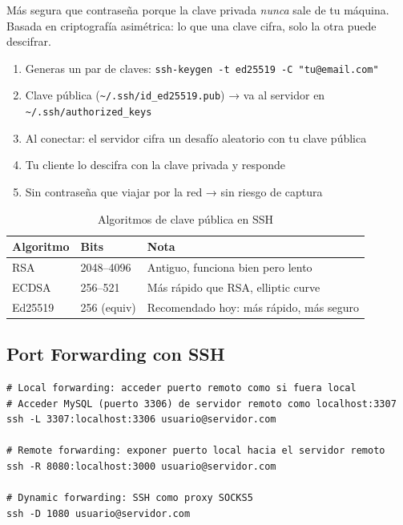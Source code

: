\begin{concepto}
Más segura que contraseña porque la clave privada \textit{nunca} sale de
tu máquina. Basada en criptografía asimétrica: lo que una clave cifra,
solo la otra puede descifrar.
\end{concepto}

\begin{enumerate}
    \item Generas un par de claves: \texttt{ssh-keygen -t ed25519 -C "tu@email.com"}
    \item Clave pública (\texttt{\textasciitilde/.ssh/id\_ed25519.pub}) → va al servidor
          en \texttt{\textasciitilde/.ssh/authorized\_keys}
    \item Al conectar: el servidor cifra un desafío aleatorio con tu clave pública
    \item Tu cliente lo descifra con la clave privada y responde
    \item Sin contraseña que viajar por la red → sin riesgo de captura
\end{enumerate}

\begin{table}[h!]
\centering
\renewcommand{\arraystretch}{1.3}
\begin{tabular}{lll}
\toprule
\textbf{Algoritmo} & \textbf{Bits} & \textbf{Nota} \\
\midrule
RSA       & 2048--4096  & Antiguo, funciona bien pero lento \\
ECDSA     & 256--521    & Más rápido que RSA, elliptic curve \\
Ed25519   & 256 (equiv) & Recomendado hoy: más rápido, más seguro \\
\bottomrule
\end{tabular}
\caption{Algoritmos de clave pública en SSH}
\end{table}

\subsection{Port Forwarding con SSH}

\begin{codigo}
\begin{lstlisting}
# Local forwarding: acceder puerto remoto como si fuera local
# Acceder MySQL (puerto 3306) de servidor remoto como localhost:3307
ssh -L 3307:localhost:3306 usuario@servidor.com

# Remote forwarding: exponer puerto local hacia el servidor remoto
ssh -R 8080:localhost:3000 usuario@servidor.com

# Dynamic forwarding: SSH como proxy SOCKS5
ssh -D 1080 usuario@servidor.com
\end{lstlisting}
\end{codigo}

